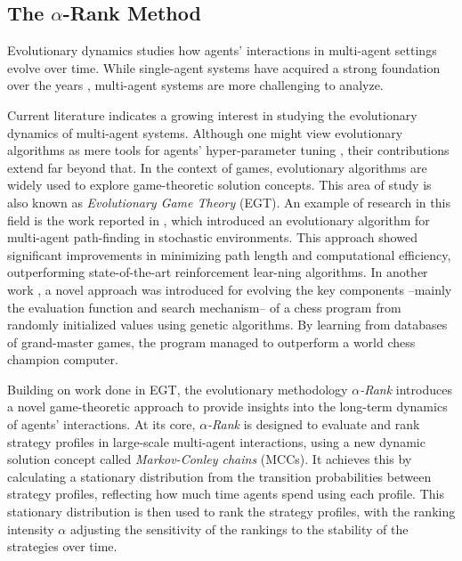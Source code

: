 \subsection{The \texorpdfstring{$\alpha$}{alpha}-Rank Method}

    Evolutionary dynamics studies how agents' interactions in multi-agent settings evolve over time. While single-agent systems have acquired a strong foundation over the years \cite{10.5555/2831071.2831085}, multi-agent systems are more challenging to analyze.\tinydouble

    \noindent
    Current literature indicates a growing interest in studying the evolutionary dynamics of multi-agent systems. Although one might view evolutionary algorithms as mere tools for agents' hyper-parameter tuning \cite{Sinha_2023}\cite{ganapathy2020studygeneticalgorithmshyperparameter}, their contributions extend far beyond that. In the context of games, evolutionary algorithms are widely used to explore game-theoretic solution concepts. This area of study is also known as \emph{Evolutionary Game Theory} (EGT). An example of research in this field is the work reported in \cite{paul2022multiagentpathfinding}, which introduced an evolutionary algorithm for multi-agent path-finding in stochastic environments. This approach showed significant improvements in minimizing path length and computational efficiency, outperforming state-of-the-art reinforcement lear-ning algorithms. In another work \cite{David_2014}, a novel approach was introduced for evolving the key components --mainly the evaluation function and search mechanism-- of a chess program from randomly initialized values using genetic algorithms. By learning from databases of grand-master games, the program managed to outperform a world chess champion computer.\tinydouble
    
    \noindent
    Building on work done in EGT, the evolutionary methodology \emph{$\alpha$-Rank} \cite{omidshafiei2019alpharank} introduces a novel game-theoretic approach to provide insights into the long-term dynamics of agents' interactions. At its core, \emph{$\alpha$-Rank} is designed to evaluate and rank strategy profiles in large-scale multi-agent interactions, using a new dynamic solution concept called \emph{Markov-Conley chains} (MCCs). It achieves this by calculating a stationary distribution from the transition probabilities between strategy profiles, reflecting how much time agents spend using each profile. This stationary distribution is then used to rank the strategy profiles, with the ranking intensity $\alpha$ adjusting the sensitivity of the rankings to the stability of the strategies over time.

